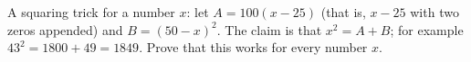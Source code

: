 A squaring trick for a number $x$: let $A=100(x-25)$ (that is, $x-25$ with two zeros appended) and $B=(50-x)^2$. The claim is that $x^2=A+B$; for example $43^2=1800+49=1849$. Prove that this works for every number $x$.
